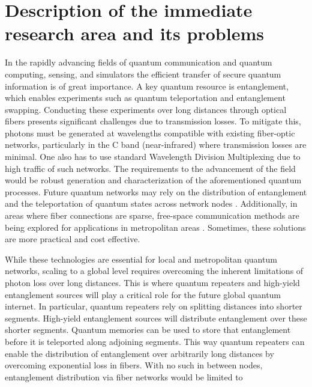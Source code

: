 \documentclass{article}
\begin{document}
\section{Description of the immediate research area and its problems}

In the rapidly advancing fields of quantum communication and quantum computing,
sensing, and simulators the efficient transfer of secure quantum information is
of great importance. A key quantum resource is entanglement, which enables
experiments such as quantum teleportation and entanglement swapping. Conducting
these experiments over long distances through optical fibers presents
significant challenges due to transmission losses. To mitigate this, photons
must be generated at wavelengths compatible with existing fiber-optic networks,
particularly in the C band (near-infrared) where transmission losses are
minimal. One also has to use standard Wavelength Division Multiplexing due to
high traffic of such networks.
The requirements to the advancement of the field would be robust generation and
characterization of the aforementioned quantum processes. Future quantum
networks may rely on the distribution of entanglement and the teleportation of
quantum states across network nodes \cite{Kimble_2008}. Additionally, in areas
where fiber connections are sparse, free-space communication methods are being
explored for applications in metropolitan areas \cite{Kržić_et_al_2023}.
Sometimes, these solutions are more practical and cost effective. \par While
these technologies are essential for local and metropolitan quantum networks,
scaling to a global level requires overcoming the inherent limitations of
photon loss over long distances. This is where quantum repeaters and high-yield
entanglement sources will play a critical role for the future global quantum
internet. In particular, quantum repeaters rely on splitting distances into
shorter segments. High-yield entanglement sources will distribute entanglement
over these shorter segments. Quantum memories can be used to store that
entanglement before it is teleported along adjoining segments. This way quantum
repeaters can enable the distribution of entanglement over arbitrarily long
distances by overcoming exponential loss in fibers. With no such in between
nodes, entanglement distribution via fiber networks would be limited to
\end{document}
